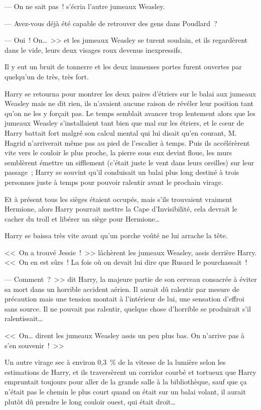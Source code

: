 --- On ne sait pas~! s'écria l'autre jumeaux Weasley.

--- Avez-vous déjà été capable de retrouver des gens dans Poudlard~?

--- Oui~! On…~>> et les jumeaux Weasley se turent soudain, et ils regardèrent dans le vide, leurs deux visages roux devenus inexpressifs.

Il y eut un bruit de tonnerre et les deux immenses portes furent ouvertes par quelqu'un de très, très fort.

Harry se retourna pour montrer les deux paires d'étriers sur le balai aux jumeaux Weasley mais ne dit rien, ils n'avaient aucune raison de révéler leur position tant qu'on ne les y forçait pas. Le temps semblait avancer trop lentement alors que les jumeaux Weasley s'installaient tant bien que mal sur les étriers, et le cœur de Harry battait fort malgré son calcul mental qui lui disait qu'en courant, M. Hagrid n'arriverait même pas au pied de l'escalier à temps. Puis ils accélérèrent vite vers le couloir le plus proche, la pierre sous eux devint floue, les murs semblèrent émettre un sifflement (c'était juste le vent dans leurs oreilles) sur leur passage~; Harry se souvint qu'il conduisait un balai plus long destiné à trois personnes juste à temps pour pouvoir ralentir avant le prochain virage.

Et à présent tous les sièges étaient occupés, mais s'ils trouvaient vraiment Hermione, alors Harry pourrait mettre la Cape d'Invisibilité, cela devrait le cacher du troll et libérer un siège pour Hermione…

Harry se baissa très vite avant qu'un porche voûté ne lui arrache la tête.

<<~On a trouvé Jessie~!~>> lâchèrent les jumeaux Weasley, assis derrière Harry. <<~On en est sûrs~! La fois où on devait lui dire que Rusard le pourchassait~!

--- Comment~?~>> dit Harry, la majeure partie de son cerveau consacrée à éviter sa mort dans un horrible accident aérien. Il aurait dû ralentir par mesure de précaution mais une tension montait à l'intérieur de lui, une sensation d'effroi sans source. Il ne pouvait pas ralentir, quelque chose d'horrible se produirait s'il ralentissait…

<<~On… dirent les jumeaux Weasley assis un peu plus bas. On n'arrive pas à s'en souvenir~!~>>

Un autre virage sec à environ 0,3~\% de la vitesse de la lumière selon les estimations de Harry, et ils traversèrent un corridor courbé et tortueux que Harry empruntait toujours pour aller de la grande salle à la bibliothèque, sauf que ça n'était pas le chemin le plus court quand on était sur un balai volant, il aurait plutôt dû prendre le long couloir ouest, qui était droit…

